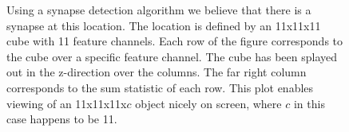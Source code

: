 \documentclass[simplex.tex]{subfiles}
\begin{document}
\begin{figure}[!ht]
\begin{cframed}
\caption{
  Using a synapse detection algorithm we believe that there is a synapse
  at this location.  The location is defined by an 11x11x11 cube with 11
  feature channels. Each row of the figure corresponds to the cube over
  a specific feature channel.  The cube has been splayed out in the
  z-direction over the columns. The far right column corresponds to the
  sum statistic of each row.  This plot enables viewing of an
  11x11x11x$c$ object nicely on screen, where $c$ in this case happens
  to be 11. 
}
\label{fig:meda:synaptogram}
\end{cframed}
\end{figure}

\clearpage
\end{document}
